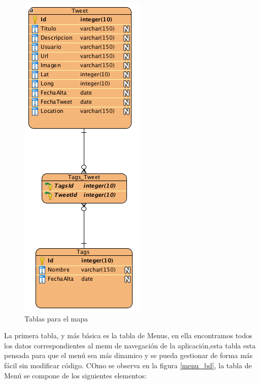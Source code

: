 \begin{figure}
\begin{center}
\includegraphics[scale=0.7]{imagenes/map.png}
\caption{Tablas para el mapa}
\label{map_bd}
\end{center}
\end{figure}


\vspace{5 mm}

La primera tabla, y más básica es la tabla de Menus, en ella encontramos todos los datos correspondientes al menu de navegación de la aplicación,esta tabla esta pensada para que el menú sea más dinamico y se pueda gestionar de forma más fácil sin modificar código. COmo se observa en la figura \ref{menu_bd}, la tabla de Menú se compone de los siguientes elementos:

